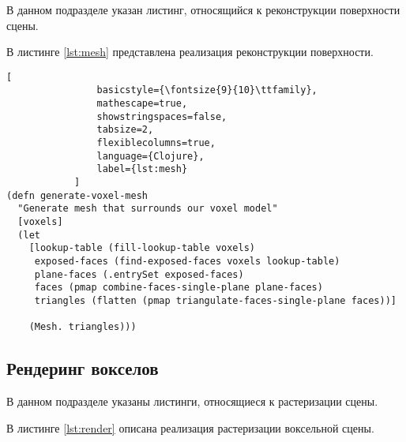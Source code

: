 В данном подразделе указан листинг, относящийся к реконструкции поверхности сцены.

В листинге \ref{lst:mesh} представлена реализация реконструкции поверхности.

\begin{lstlisting}[
                basicstyle={\fontsize{9}{10}\ttfamily},
                mathescape=true,
                showstringspaces=false,
                tabsize=2,
                flexiblecolumns=true,
                language={Clojure},
                label={lst:mesh}
            ]
(defn generate-voxel-mesh
  "Generate mesh that surrounds our voxel model"
  [voxels]
  (let
    [lookup-table (fill-lookup-table voxels)
     exposed-faces (find-exposed-faces voxels lookup-table)
     plane-faces (.entrySet exposed-faces)
     faces (pmap combine-faces-single-plane plane-faces)
     triangles (flatten (pmap triangulate-faces-single-plane faces))]

    (Mesh. triangles)))
\end{lstlisting}

\subsection{Рендеринг вокселов}

В данном подразделе указаны листинги, относящиеся к растеризации сцены.

В листинге \ref{lst:render} описана реализация растеризации воксельной сцены.

